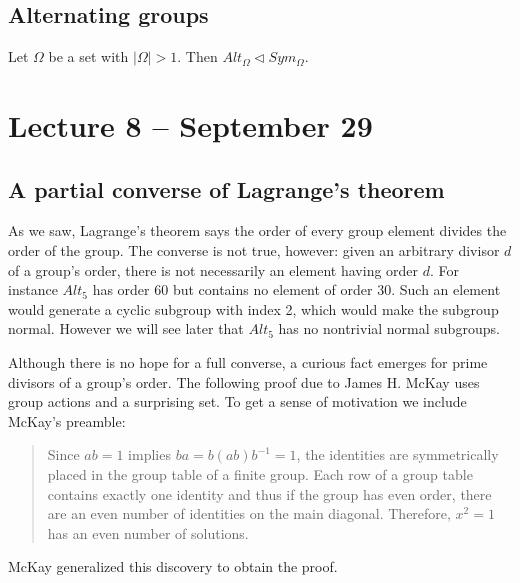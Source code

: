\documentclass[letterpaper]{article}
\begin{document}
\subsection{Alternating groups}

Let $\Omega$ be a set with $|\Omega|>1$. Then $Alt_\Omega \lhd Sym_\Omega$.

\section{Lecture 8 -- September 29}

\subsection{A partial converse of Lagrange's theorem}

As we saw, Lagrange's theorem says the order of every group element divides the order of the group. The converse is not true, however: given an arbitrary divisor $d$ of a group's order, there is not necessarily an element having order $d$. For instance $Alt_5$ has order 60 but contains no element of order 30. Such an element would generate a cyclic subgroup with index 2, which would make the subgroup normal. However we will see later that $Alt_5$ has no nontrivial normal subgroups.

Although there is no hope for a full converse, a curious fact emerges for prime divisors of a group's order. The following proof due to James H. McKay \cite{McKay59} uses group actions and a surprising set. To get a sense of motivation we include McKay's preamble: \begin{quote}
Since $ab=1$ implies $ba=b(ab)b^{-1}=1$, the identities are symmetrically placed in the group table of a finite group. Each row of a group table contains exactly one identity and thus if the group has even order, there are an even number of identities on the main diagonal. Therefore, $x^2=1$ has an even number of solutions. \end{quote}

McKay generalized this discovery to obtain the proof.
\end{document}
